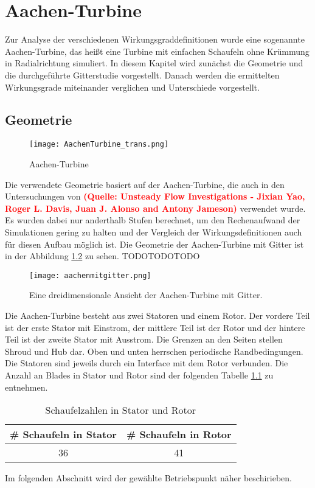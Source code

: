 \chapter{Aachen-Turbine}
\label{cha:aachen}
Zur Analyse der verschiedenen Wirkungsgraddefinitionen wurde eine sogenannte Aachen-Turbine, das heißt eine Turbine mit einfachen Schaufeln ohne Krümmung in Radialrichtung simuliert. In diesem Kapitel wird zunächst die Geometrie und die durchgeführte Gitterstudie vorgestellt. Danach werden die ermittelten Wirkungsgrade miteinander verglichen und Unterschiede vorgestellt.
\section{Geometrie}
\label{sec:aachengeo}
  \begin{figure}[htbp]
	\centering
	\label{fig:imgAachenTurbine}
	\texttt{[image: AachenTurbine\_trans.png]}
	\caption{Aachen-Turbine}
\end{figure} 
Die verwendete Geometrie basiert auf der Aachen-Turbine, die auch in den Untersuchungen von \textcolor{red}{\textbf{(Quelle: Unsteady Flow Investigations - Jixian Yao, Roger L. Davis, Juan J. Alonso and Antony Jameson)}} verwendet wurde. Es wurden dabei nur anderthalb Stufen berechnet, um den Rechenaufwand der Simulationen gering zu halten und der Vergleich der Wirkungsdefinitionen auch für diesen Aufbau möglich ist. Die Geometrie der Aachen-Turbine mit Gitter ist in der Abbildung \ref{fig:aachengebiet} zu sehen. TODOTODOTODO
\begin{figure}[H]
\texttt{[image: aachenmitgitter.png]}
\caption{Eine dreidimensionale Ansicht der Aachen-Turbine mit Gitter.}
\label{fig:aachengebiet}
\end{figure}
Die Aachen-Turbine besteht aus zwei Statoren und einem Rotor. Der vordere Teil ist der erste Stator mit Einstrom, der mittlere Teil ist der Rotor und der hintere Teil ist der zweite Stator mit Ausstrom. Die Grenzen an den Seiten stellen Shroud und Hub dar. Oben und unten herrschen periodische Randbedingungen. Die Statoren sind jeweils durch ein Interface mit dem Rotor verbunden. Die Anzahl an Blades in Stator und Rotor sind der folgenden Tabelle \ref{tab:aachenabmessungen} zu entnehmen.
\begin{table}[H]
\centering
\label{tab:aachenabmessungen}
\caption{Schaufelzahlen in Stator und Rotor}
\begin{tabular}{ c| c}
\# Schaufeln in Stator&\# Schaufeln in Rotor\\
\hline
36&41\\
\end{tabular}
\end{table}
Im folgenden Abschnitt wird der gewählte Betriebspunkt näher beschirieben.
